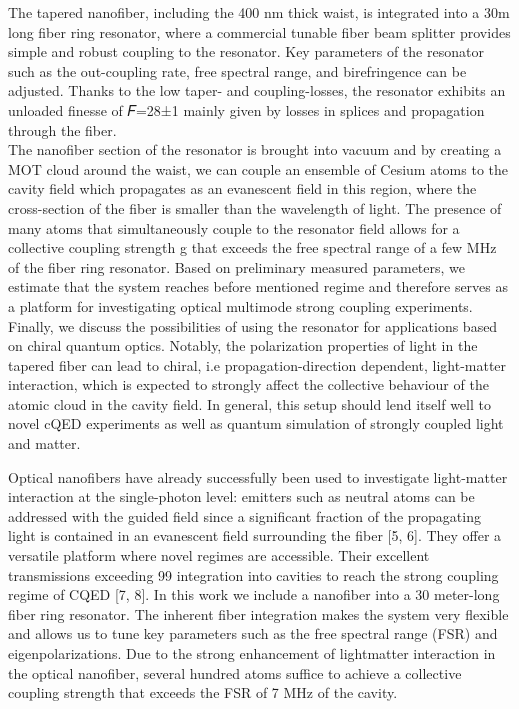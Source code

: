\documentclass{scdpg}
\begin{document}
\begin{scAbstract}
The tapered nanofiber, including the 400 nm thick waist, is integrated into a 30m long fiber ring resonator, where a commercial tunable fiber beam splitter provides simple and robust coupling to the resonator. Key parameters of the resonator such as the out-coupling rate, free spectral range, and birefringence can be adjusted. Thanks to the low taper- and coupling-losses, the resonator exhibits an unloaded finesse of 𝐹=28±1 mainly given by losses in splices and propagation through the fiber.
\\
The nanofiber section of the resonator is brought into vacuum and by creating a MOT cloud around the waist, we can couple an ensemble of Cesium atoms to the cavity field which propagates as an evanescent field in this region, where the cross-section of the fiber is smaller than the wavelength of light. The presence of many atoms that simultaneously couple to the resonator field allows for a collective coupling strength g that exceeds the free spectral range of a few MHz of the fiber ring resonator. Based on preliminary measured parameters, we estimate that the system reaches before mentioned regime and therefore serves as a platform for investigating optical multimode strong coupling experiments. 
Finally, we discuss the possibilities of using the resonator for applications based on chiral quantum optics. Notably, the polarization properties of light in the tapered fiber can lead to chiral, i.e propagation-direction dependent, light-matter interaction, which is expected to strongly affect the collective behaviour of the atomic cloud in the cavity field. In general, this setup should lend itself well to novel cQED experiments as well as quantum simulation of strongly coupled light and matter.

Optical nanofibers have already successfully been used to investigate light-matter
interaction at the single-photon level: emitters such as neutral atoms can be addressed
with the guided field since a significant fraction of the propagating light is contained in an
evanescent field surrounding the fiber [5, 6]. They offer a versatile platform where novel
regimes are accessible. Their excellent transmissions exceeding 99%
integration into cavities to reach the strong coupling regime of CQED [7, 8]. In this work we
include a nanofiber into a 30 meter-long fiber ring resonator. The inherent fiber integration
makes the system very flexible and allows us to tune key parameters such as the free
spectral range (FSR) and eigenpolarizations. Due to the strong enhancement of lightmatter
interaction in the optical nanofiber, several hundred atoms suffice to achieve a
collective coupling strength that exceeds the FSR of 7 MHz of the cavity.


\end{scAbstract}
\end{document}
